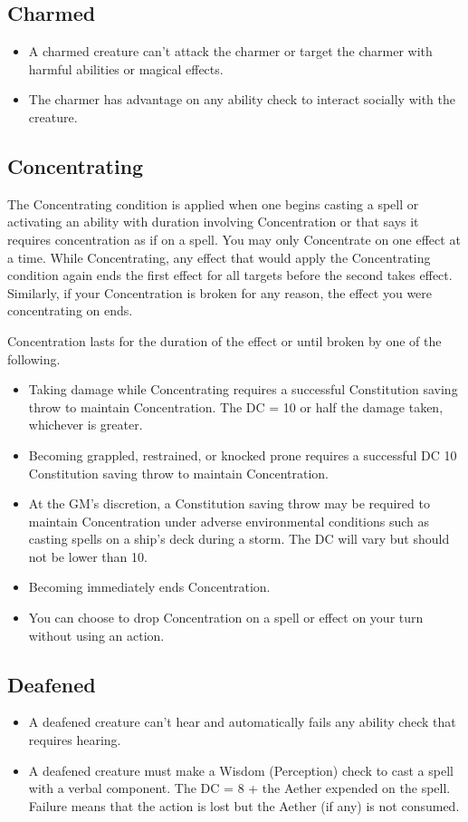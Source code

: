 \subsection{Charmed\label{condition:charmed}}
\begin{itemize}
\item A charmed creature can't attack the charmer or target the charmer with harmful abilities or magical effects.
\item The charmer has advantage on any ability check to interact socially with the creature.
\end{itemize}

\subsection{Concentrating\label{condition:concentrating}}
The Concentrating condition is applied when one begins casting a spell or activating an ability with duration involving Concentration or that says it requires concentration as if on a spell. You may only Concentrate on one effect at a time. While Concentrating, any effect that would apply the Concentrating condition again ends the first effect for all targets before the second takes effect. Similarly, if your Concentration is broken for any reason, the effect you were concentrating on ends.

Concentration lasts for the duration of the effect or until broken by one of the following.
\begin{itemize}
	\item Taking damage while Concentrating requires a successful Constitution saving throw to maintain Concentration. The DC = 10 or half the damage taken, whichever is greater.
	\item Becoming grappled, restrained, or knocked prone requires a successful DC 10 Constitution saving throw to maintain Concentration.
	\item At the GM's discretion, a Constitution saving throw may be required to maintain Concentration under adverse environmental conditions such as casting spells on a ship's deck during a storm. The DC will vary but should not be lower than 10.
	\item Becoming  immediately ends Concentration.
	\item You can choose to drop Concentration on a spell or effect on your turn without using an action.
\end{itemize}

\subsection{Deafened\label{condition:deafened}}
\begin{itemize}
\item A deafened creature can't hear and automatically fails any ability check that requires hearing.
\item A deafened creature must make a Wisdom (Perception) check to cast a spell with a verbal component. The DC = 8 + the Aether expended on the spell. Failure means that the action is lost but the Aether (if any) is not consumed.
\end{itemize}

